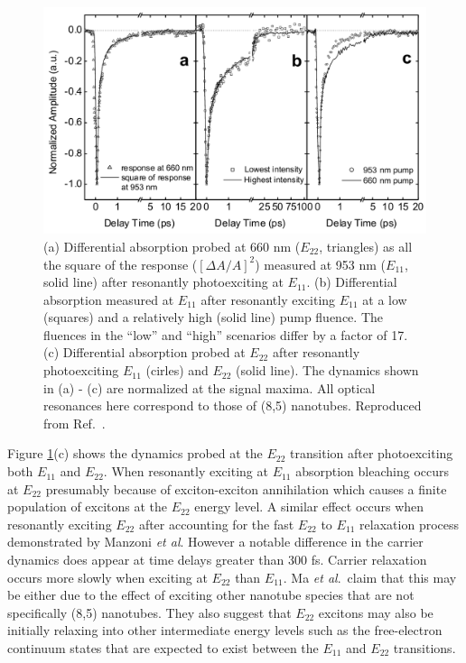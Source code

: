 \begin{figure}[ht]
	\centering
	\includegraphics[scale=0.35]{images/chapter_prior_works/abs_ma_2005}
	\caption{(a) Differential absorption probed at 660 nm ($E_{22}$, triangles) as all the square of the response ($[ \Delta A / A ]^2$) measured at 953 nm ($E_{11}$, solid line) after resonantly photoexciting at $E_{11}$. (b) Differential absorption  measured at $E_{11}$ after resonantly exciting $E_{11}$ at a low (squares) and a relatively high (solid line) pump fluence. The fluences in the ``low'' and ``high'' scenarios differ by a factor of 17. (c) Differential absorption probed at $E_{22}$ after resonantly photoexciting $E_{11}$ (cirles) and $E_{22}$ (solid line). The dynamics shown in (a) - (c) are normalized at the signal maxima. All optical resonances here correspond to those of (8,5) nanotubes. Reproduced from Ref.\ \cite{ma2005femtosecond}.}
	\label{fig:abs_ma_2005}
\end{figure}

 Figure \ref{fig:abs_ma_2005}(c) shows the dynamics probed at the $E_{22}$ transition after photoexciting both $E_{11}$ and $E_{22}$. When resonantly exciting at $E_{11}$ absorption bleaching occurs at $E_{22}$ presumably because of exciton-exciton annihilation which causes a finite population of excitons at the $E_{22}$ energy level. A similar effect occurs when resonantly exciting $E_{22}$ after accounting for the fast $E_{22}$ to $E_{11}$ relaxation process demonstrated by Manzoni \textit{et al}. However a notable difference in the carrier dynamics does appear at time delays greater than 300 fs. Carrier relaxation occurs more slowly when exciting at $E_{22}$ than $E_{11}$. Ma \textit{et al}.\ claim that this may be either due to the effect of exciting other nanotube species that are not specifically (8,5) nanotubes. They also suggest that $E_{22}$ excitons may also be initially relaxing into other intermediate energy levels such as the free-electron continuum states that are expected to exist between the $E_{11}$ and $E_{22}$ transitions.

